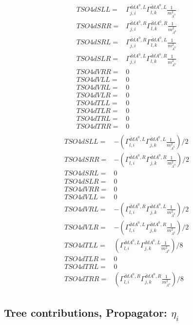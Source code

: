 \documentclass[A4,landscape]{article}
\begin{document}
\begin{align} 
  TSO4dSLL= & \Gamma^{\bar{d}d A^0 ,L}_{j, i} \Gamma^{\bar{d}d A^0 ,L}_{l, k} \frac{1}{m^2_{A^0}} \\ 
  TSO4dSRR= & \Gamma^{\bar{d}d A^0 ,R}_{j, i} \Gamma^{\bar{d}d A^0 ,R}_{l, k} \frac{1}{m^2_{A^0}} \\ 
  TSO4dSRL= & \Gamma^{\bar{d}d A^0 ,R}_{j, i} \Gamma^{\bar{d}d A^0 ,L}_{l, k} \frac{1}{m^2_{A^0}} \\ 
  TSO4dSLR= & \Gamma^{\bar{d}d A^0 ,L}_{j, i} \Gamma^{\bar{d}d A^0 ,R}_{l, k} \frac{1}{m^2_{A^0}} \\ 
  TSO4dVRR= & 0 \\ 
  TSO4dVLL= & 0 \\ 
  TSO4dVRL= & 0 \\ 
  TSO4dVLR= & 0 \\ 
  TSO4dTLL= & 0 \\ 
  TSO4dTLR= & 0 \\ 
  TSO4dTRL= & 0 \\ 
  TSO4dTRR= & 0 \\ 
\end{align} 
\begin{align} 
  TSO4dSLL= & -(\Gamma^{\bar{d}d A^0 ,L}_{l, i} \Gamma^{\bar{d}d A^0 ,L}_{j, k} \frac{1}{m^2_{A^0}})/2 \\ 
  TSO4dSRR= & -(\Gamma^{\bar{d}d A^0 ,R}_{l, i} \Gamma^{\bar{d}d A^0 ,R}_{j, k} \frac{1}{m^2_{A^0}})/2 \\ 
  TSO4dSRL= & 0 \\ 
  TSO4dSLR= & 0 \\ 
  TSO4dVRR= & 0 \\ 
  TSO4dVLL= & 0 \\ 
  TSO4dVRL= & -(\Gamma^{\bar{d}d A^0 ,R}_{l, i} \Gamma^{\bar{d}d A^0 ,L}_{j, k} \frac{1}{m^2_{A^0}})/2 \\ 
  TSO4dVLR= & -(\Gamma^{\bar{d}d A^0 ,L}_{l, i} \Gamma^{\bar{d}d A^0 ,R}_{j, k} \frac{1}{m^2_{A^0}})/2 \\ 
  TSO4dTLL= & (\Gamma^{\bar{d}d A^0 ,L}_{l, i} \Gamma^{\bar{d}d A^0 ,L}_{j, k} \frac{1}{m^2_{A^0}})/8 \\ 
  TSO4dTLR= & 0 \\ 
  TSO4dTRL= & 0 \\ 
  TSO4dTRR= & (\Gamma^{\bar{d}d A^0 ,R}_{l, i} \Gamma^{\bar{d}d A^0 ,R}_{j, k} \frac{1}{m^2_{A^0}})/8 \\ 
\end{align} 
\subsection{Tree contributions, Propagator: $\eta_i$} 
\end{document}
